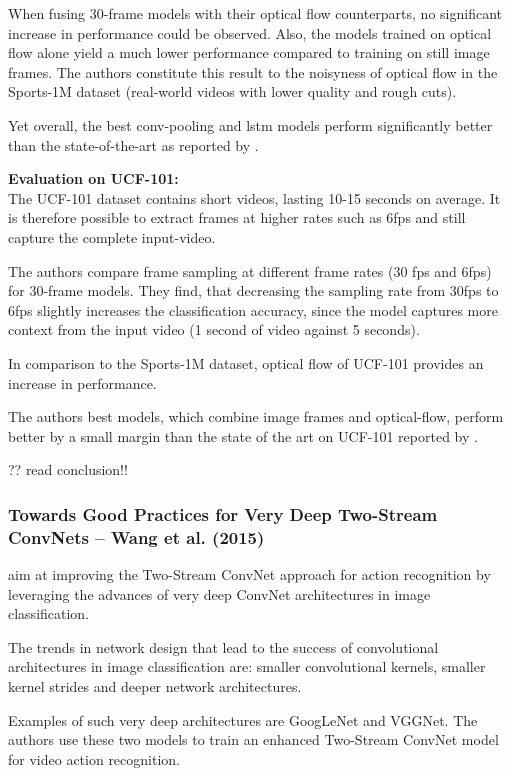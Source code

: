 When fusing 30-frame models with their optical flow counterparts, no significant increase in performance could be observed.
Also, the models trained on optical flow alone yield a much lower performance compared to training on still image frames.
The authors constitute this result to the noisyness of optical flow in the Sports-1M dataset (real-world videos with lower quality and rough cuts).

Yet overall, the best conv-pooling and lstm models perform significantly better than the state-of-the-art as reported by \textcite{karpathy_large-scale_2014}.

\textbf{Evaluation on UCF-101:}\\
The UCF-101 dataset contains short videos, lasting 10-15 seconds on average. It is therefore possible to extract frames at higher rates such as 6fps and still capture the complete input-video.

The authors compare frame sampling at different frame rates (30 fps and 6fps) for 30-frame models. They find, that decreasing the sampling rate from 30fps to 6fps slightly increases the classification accuracy, since the model captures more context from the input video (1 second of video against 5 seconds).

In comparison to the Sports-1M dataset, optical flow of UCF-101 provides an increase in performance.

The authors best models, which combine image frames and optical-flow, perform better by a small margin than the state of the art on UCF-101 reported by \textcite{simonyan_two-stream_2014}.

?? read conclusion!!


\subsubsection{Towards Good Practices for Very Deep Two-Stream ConvNets -- Wang et al. (2015)}
\cite{wang_towards_2015}

\textcite{wang_towards_2015} aim at improving the Two-Stream ConvNet approach for action recognition\cite{simonyan_two-stream_2014} by leveraging the advances of very deep ConvNet architectures in image classification.

The trends in network design that lead to the success of convolutional architectures in image classification are: smaller convolutional kernels, smaller kernel strides and deeper network architectures.

Examples of such very deep architectures are GoogLeNet\cite{szegedy_going_2015} and VGGNet\cite{simonyan_very_2014}.
The authors use these two models to train an enhanced Two-Stream ConvNet model for video action recognition.

